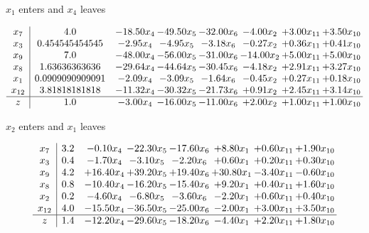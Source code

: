 \documentclass[9pt]{article}
\begin{document}
 $ x_{1} $ enters and $ x_{4} $ leaves 

 \[\begin{array}{c| c c@{\hskip 2pt} c@{\hskip 2pt} c@{\hskip 2pt} c@{\hskip 2pt} c@{\hskip 2pt} c@{\hskip 2pt} }
 x_{7}   &  4.0 & -18.50 x_{4} & -49.50 x_{5} & -32.00 x_{6} & -4.00 x_{2} & +  3.00 x_{11} & +  3.50 x_{10}\\
 x_{3}   &  0.454545454545 & -2.95 x_{4} & -4.95 x_{5} & -3.18 x_{6} & -0.27 x_{2} & +  0.36 x_{11} & +  0.41 x_{10}\\
 x_{9}   &  7.0 & -48.00 x_{4} & -56.00 x_{5} & -31.00 x_{6} & -14.00 x_{2} & +  5.00 x_{11} & +  5.00 x_{10}\\
 x_{8}   &  1.63636363636 & -29.64 x_{4} & -44.64 x_{5} & -30.45 x_{6} & -4.18 x_{2} & +  2.91 x_{11} & +  3.27 x_{10}\\
 x_{1}   &  0.0909090909091 & -2.09 x_{4} & -3.09 x_{5} & -1.64 x_{6} & -0.45 x_{2} & +  0.27 x_{11} & +  0.18 x_{10}\\
 x_{12}   &  3.81818181818 & -11.32 x_{4} & -30.32 x_{5} & -21.73 x_{6} & +  0.91 x_{2} & +  2.45 x_{11} & +  3.14 x_{10}\\
\hline
z    &  1.0 & -3.00 x_{4} & -16.00 x_{5} & -11.00 x_{6} & +  2.00 x_{2} & +  1.00 x_{11} & +  1.00 x_{10}\\
\end{array}\]


 $ x_{2} $ enters and $ x_{1} $ leaves 

 \[\begin{array}{c| c c@{\hskip 2pt} c@{\hskip 2pt} c@{\hskip 2pt} c@{\hskip 2pt} c@{\hskip 2pt} c@{\hskip 2pt} }
 x_{7}   &  3.2 & -0.10 x_{4} & -22.30 x_{5} & -17.60 x_{6} & +  8.80 x_{1} & +  0.60 x_{11} & +  1.90 x_{10}\\
 x_{3}   &  0.4 & -1.70 x_{4} & -3.10 x_{5} & -2.20 x_{6} & +  0.60 x_{1} & +  0.20 x_{11} & +  0.30 x_{10}\\
 x_{9}   &  4.2 & + 16.40 x_{4} & + 39.20 x_{5} & + 19.40 x_{6} & + 30.80 x_{1} & -3.40 x_{11} & -0.60 x_{10}\\
 x_{8}   &  0.8 & -10.40 x_{4} & -16.20 x_{5} & -15.40 x_{6} & +  9.20 x_{1} & +  0.40 x_{11} & +  1.60 x_{10}\\
 x_{2}   &  0.2 & -4.60 x_{4} & -6.80 x_{5} & -3.60 x_{6} & -2.20 x_{1} & +  0.60 x_{11} & +  0.40 x_{10}\\
 x_{12}   &  4.0 & -15.50 x_{4} & -36.50 x_{5} & -25.00 x_{6} & -2.00 x_{1} & +  3.00 x_{11} & +  3.50 x_{10}\\
\hline
z    &  1.4 & -12.20 x_{4} & -29.60 x_{5} & -18.20 x_{6} & -4.40 x_{1} & +  2.20 x_{11} & +  1.80 x_{10}\\
\end{array}\]
\end{document}
